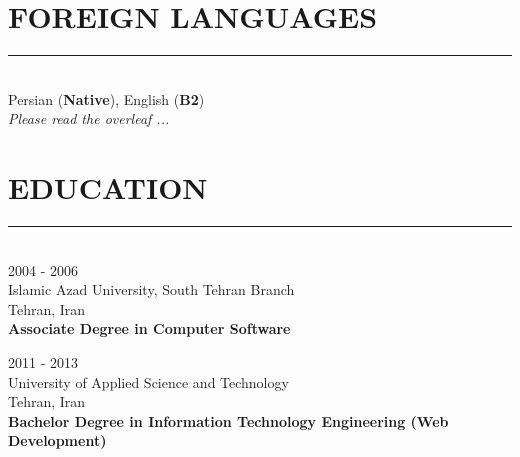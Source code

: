 \documentclass[10pt,a4paper]{article}
\begin{document}
\section{FOREIGN LANGUAGES}
\noindent \rule {18.0cm}{0.2pt} \\
    Persian (\textbf{Native}), English (\textbf{B2}) \\
    
\noindent \textit{Please read the overleaf ...}
    
\break

\section{EDUCATION}
\noindent \rule {18.0cm}{0.2pt} \\
\textbullet \hspace{0.1cm} 2004 - 2006 \\
Islamic Azad University, South Tehran Branch \\
Tehran, Iran \\
\textbf{Associate Degree in Computer Software}
\vspace{0.3cm}

\noindent \textbullet \hspace{0.1cm}  2011 - 2013 \\
University of Applied Science and Technology \\
Tehran, Iran \\
\textbf{Bachelor Degree in Information Technology Engineering (Web Development)}
\end{document}
